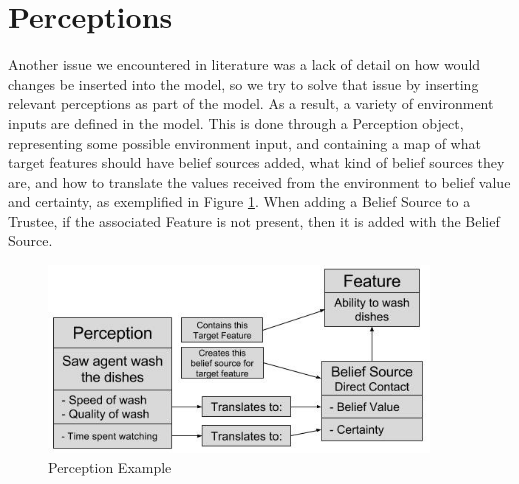 \section{Perceptions}
Another issue we encountered in literature was a lack of detail on how would changes be inserted into the model, so we try to solve that issue by inserting relevant perceptions as part of the model. As a result, a variety of environment inputs are defined in the model. This is done through a Perception object, representing some possible environment input, and containing a map of what target features should have belief sources added, what kind of belief sources they are, and how to translate the values received from the environment to belief value and certainty, as exemplified in Figure \ref{fig:Perceptions Diagram}. When adding a Belief Source to a Trustee, if the associated Feature is not present, then it is added with the Belief Source.

\begin{figure}[hbt]
    \centering
    \includegraphics[width=0.9\textwidth]{figures/PerceptionsDiagram.jpg}
    \caption{Perception Example}
    \label{fig:Perceptions Diagram}
\end{figure}

